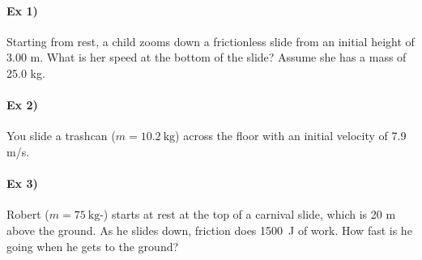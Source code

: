 \documentclass[12pt]{exam}
\begin{document}
\pagestyle{empty}

\paragraph{Ex 1)}
  Starting from rest, a child zooms down a frictionless slide from an initial height of 3.00 m.  What is her speed at the bottom of the slide?  Assume she has a mass of 25.0 kg.

\pagebreak

\paragraph{Ex 2)}
  You slide a trashcan ($m = \SI{10.2}{\kilo\gram}$) across the floor with an initial velocity of 7.9 m/s.
  
  \vspace{1em}
  


\paragraph{Ex 3)}
  Robert ($m = \SI{75}{\kilo\gram}$-) starts at rest at the top of a carnival slide, which is 20 m above the ground.  As he slides down, friction does \SI{1500}{\joule} of work.  How fast is he going when he gets to the ground?
\end{document}
